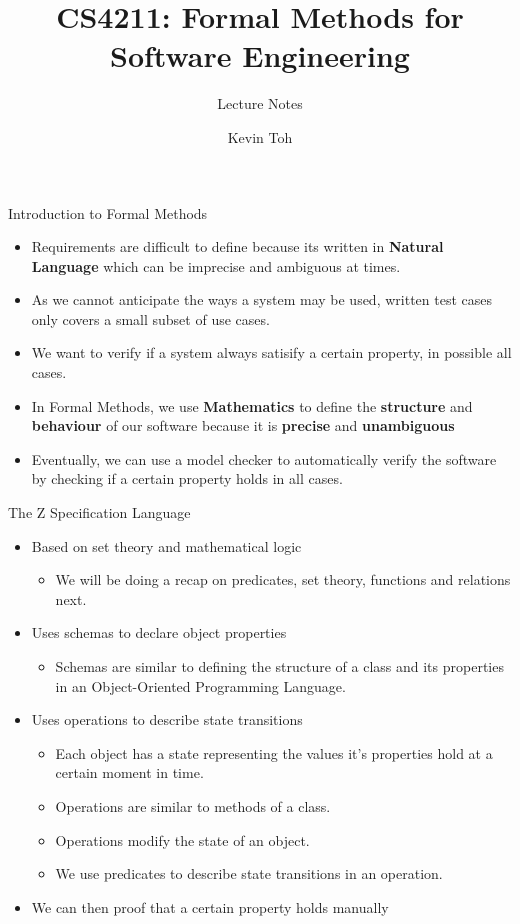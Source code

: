\documentclass[aspectratio=169]{beamer}
\title{CS4211: Formal Methods for Software Engineering}
\subtitle{Lecture Notes}
\author{Kevin Toh}
\date{}
\begin{document}
\begin{frame}
\titlepage
\end{frame}

\begin{frame}{Introduction to Formal Methods}
    \begin{itemize}
        \item Requirements are difficult to define because its written in \textbf{Natural Language} which can be imprecise and ambiguous at times.
        \item As we cannot anticipate the ways a system may be used, written test cases only covers a small subset of use cases.
        \item We want to verify if a system always satisify a certain property, in possible all cases.
        \item In Formal Methods, we use \textbf{Mathematics} to define the \textbf{structure} and \textbf{behaviour} of our software because it is \textbf{precise} and \textbf{unambiguous}
        \item Eventually, we can use a model checker to automatically verify the software by checking if a certain property holds in all cases.
    \end{itemize}
\end{frame}

\begin{frame}{The Z Specification Language}
    \begin{itemize}
        \item Based on set theory and mathematical logic
        \begin{itemize}
            \item We will be doing a recap on predicates, set theory, functions and relations next.
        \end{itemize}
        \item Uses schemas to declare object properties
        \begin{itemize}
            \item Schemas are similar to defining the structure of a class and its properties in an Object-Oriented Programming Language.
        \end{itemize}
        \item Uses operations to describe state transitions
        \begin{itemize}
            \item Each object has a state representing the values it's properties hold at a certain moment in time.
            \item Operations are similar to methods of a class. 
            \item Operations modify the state of an object.
            \item We use predicates to describe state transitions in an operation.
        \end{itemize}
        \item We can then proof that a certain property holds manually
    \end{itemize}
\end{frame}
\end{document}

